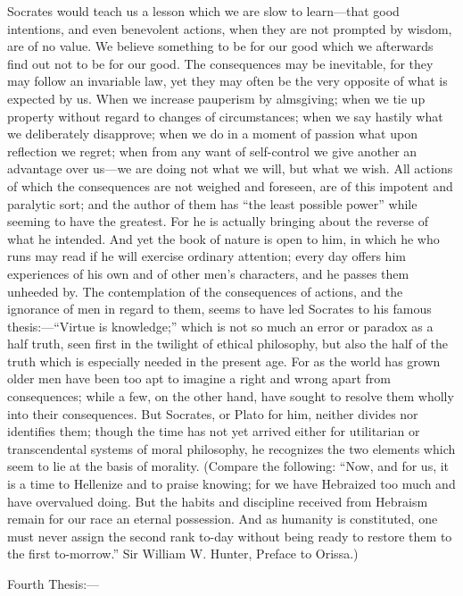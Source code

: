\documentclass[11pt,letter]{article}
\begin{document}
\par  Socrates would teach us a lesson which we are slow to learn—that good intentions, and even benevolent actions, when they are not prompted by wisdom, are of no value. We believe something to be for our good which we afterwards find out not to be for our good. The consequences may be inevitable, for they may follow an invariable law, yet they may often be the very opposite of what is expected by us. When we increase pauperism by almsgiving; when we tie up property without regard to changes of circumstances; when we say hastily what we deliberately disapprove; when we do in a moment of passion what upon reflection we regret; when from any want of self-control we give another an advantage over us—we are doing not what we will, but what we wish. All actions of which the consequences are not weighed and foreseen, are of this impotent and paralytic sort; and the author of them has “the least possible power” while seeming to have the greatest. For he is actually bringing about the reverse of what he intended. And yet the book of nature is open to him, in which he who runs may read if he will exercise ordinary attention; every day offers him experiences of his own and of other men’s characters, and he passes them unheeded by. The contemplation of the consequences of actions, and the ignorance of men in regard to them, seems to have led Socrates to his famous thesis:—“Virtue is knowledge;” which is not so much an error or paradox as a half truth, seen first in the twilight of ethical philosophy, but also the half of the truth which is especially needed in the present age. For as the world has grown older men have been too apt to imagine a right and wrong apart from consequences; while a few, on the other hand, have sought to resolve them wholly into their consequences. But Socrates, or Plato for him, neither divides nor identifies them; though the time has not yet arrived either for utilitarian or transcendental systems of moral philosophy, he recognizes the two elements which seem to lie at the basis of morality. (Compare the following: “Now, and for us, it is a time to Hellenize and to praise knowing; for we have Hebraized too much and have overvalued doing. But the habits and discipline received from Hebraism remain for our race an eternal possession. And as humanity is constituted, one must never assign the second rank to-day without being ready to restore them to the first to-morrow.” Sir William W. Hunter, Preface to Orissa.)

\par  Fourth Thesis:—
\end{document}
